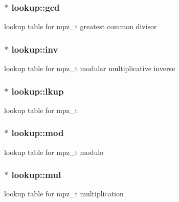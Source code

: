\subsubsection[{\texorpdfstring{gcd}{gcd}}]{$\ast$ lookup\+::gcd}\hypertarget{structlookup_aaadaeeb9f694301aec3fe2c275c6201f}{}\label{structlookup_aaadaeeb9f694301aec3fe2c275c6201f}
lookup table for mpz\+\_\+t greatest common divisor 
\subsubsection[{\texorpdfstring{inv}{inv}}]{$\ast$ lookup\+::inv}\hypertarget{structlookup_aad2f4d538e0e689ac57e456b65f36913}{}\label{structlookup_aad2f4d538e0e689ac57e456b65f36913}
lookup table for mpz\+\_\+t modular multiplicative inverse 
\subsubsection[{\texorpdfstring{lkup}{lkup}}]{$\ast$ lookup\+::lkup}\hypertarget{structlookup_aac4b32e67de7870ed7ef9da8077faf3d}{}\label{structlookup_aac4b32e67de7870ed7ef9da8077faf3d}
lookup table for mpz\+\_\+t 
\subsubsection[{\texorpdfstring{mod}{mod}}]{$\ast$ lookup\+::mod}\hypertarget{structlookup_aec682b8433afc9c027849a48f051af95}{}\label{structlookup_aec682b8433afc9c027849a48f051af95}
lookup table for mpz\+\_\+t modulo 
\subsubsection[{\texorpdfstring{mul}{mul}}]{$\ast$ lookup\+::mul}\hypertarget{structlookup_aab703d9a300ea104f80a39416e512041}{}\label{structlookup_aab703d9a300ea104f80a39416e512041}
lookup table for mpz\+\_\+t multiplication 
